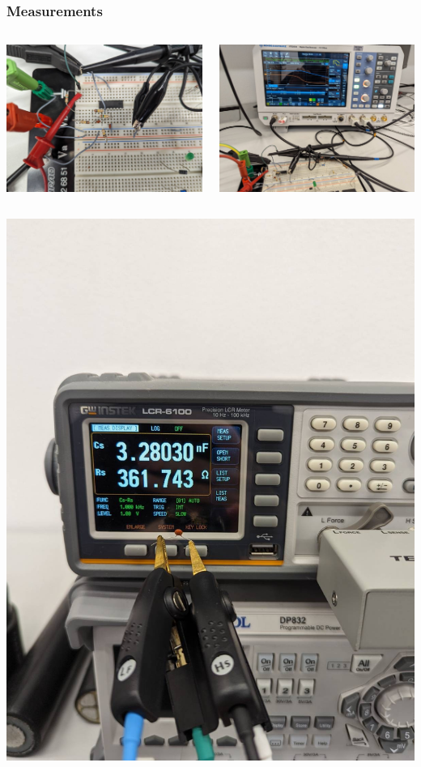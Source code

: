 \documentclass{beamer}
\begin{document}
  \begin{frame}
    \frametitle{Measurements}
    \begin{columns}
      \begin{column}{0.5\textwidth}
        \includegraphics[width=\textwidth]{images/circuit.jpeg}
      \end{column}
      \begin{column}{0.5\textwidth}
        \includegraphics[width=\textwidth]{images/osci.jpeg}
      \end{column}
    \end{columns}
    \begin{center}
      \includegraphics[width=.33\textwidth]{images/realvalue.jpeg}
    \end{center}
  \end{frame}
\end{document}
